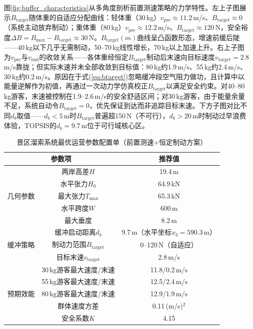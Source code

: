 \documentclass[12pt,a4paper]{ctexart}
\begin{document}
图\ref{fig:buffer_characteristics}从多角度剖析前置测速策略的力学特性。左上子图展示$B_{\text{target}}$随体重的自适应分配曲线：轻体重（30\,kg）$v_{\text{pre}}\approx 11.2$\,m/s、$B_{\text{target}}\approx 0$（系统主动放弃制动）；重体重（80\,kg）$v_{\text{pre}}\approx 12.2$\,m/s、$B_{\text{target}}\approx 120$\,N，安全裕度$\Delta B = B_{\max}-B_{\text{target}}\approx 30$\,N。$B_{\text{target}}(m)$曲线呈凸函数形态，增速前缓后陡——40\,kg以下几乎无需制动，50--70\,kg线性增长，70\,kg以上加速上升。右上子图为$v_{\text{pre}}$与$v_{\text{end}}$的收敛关系——各体重经恒定$B_{\text{target}}$制动后末速向目标速度$v_{\text{target}}=2.8$\,m/s靠拢；但实际末速并未全部收敛到目标值：80\,kg约1.9\,m/s、55\,kg约2.4\,m/s、30\,kg约0.2\,m/s。原因在于式(\ref{eq:btarget})忽略缓冲段空气阻力做功，且计算中以能量逆解作为初值，再通过一次动力学仿真校正$B_{\text{target}}$以满足安全约束。对40--80\,kg游客，末速被控制在1.9--2.6\,m/s的安全舒适区间；对30\,kg游客，由于能量余量不足，系统自动令$B_{\text{target}}=0$，优先保证到达而非追踪目标末速。下方子图对比不同$d_b$取值——$d_b<5$\,m时$B_{\text{target}}$普遍超150\,N（不可行），$d_b>20$\,m时制动过早浪费体验，TOPSIS的$d_b=9.7$\,m位于可行域核心区。

\begin{table}[H]
  \centering
  \caption{景区溜索系统最优运营参数配置单（前置测速+恒定制动方案）}
  \label{tab:optimal_config}
  \renewcommand{\arraystretch}{1.3}
  \begin{tabular}{c|c|c}
    \toprule
    \multicolumn{2}{c}{\textbf{参数项}} & \textbf{推荐值} \\
    \midrule
    \multirow{5}{*}{几何参数}
      & 两岸高差$H$ & 19.4\,m \\
      & 水平张力$H_0$ & 64.9\,kN \\
      & 最大张力$T_{\max}$ & 65.3\,kN \\
      & 水平跨度$W$ & 600\,m \\
      & 最大垂度 & 8.2\,m \\
    \midrule
    \multirow{3}{*}{缓冲策略}
      & 缓冲启动距离$d_b$ & 9.7\,m（水平坐标$x_b=590.3$\,m） \\
      & 制动力范围$B_{\text{target}}$ & 0--120\,N（自适应） \\
      & 目标末速$v_{\text{target}}$ & 2.8\,m/s \\
    \midrule
    \multirow{5}{*}{预期效能}
      & 30\,kg游客最大速度/末速 & 11.8/0.2\,m/s \\
      & 55\,kg游客最大速度/末速 & 12.5/2.4\,m/s \\
      & 80\,kg游客最大速度/末速 & 12.9/1.9\,m/s \\
      & 群体速度方差 & 0.11\,(m/s)$^2$ \\
      & 安全系数$K$ & 4.15 \\
    \bottomrule
  \end{tabular}
\end{table}
\end{document}
